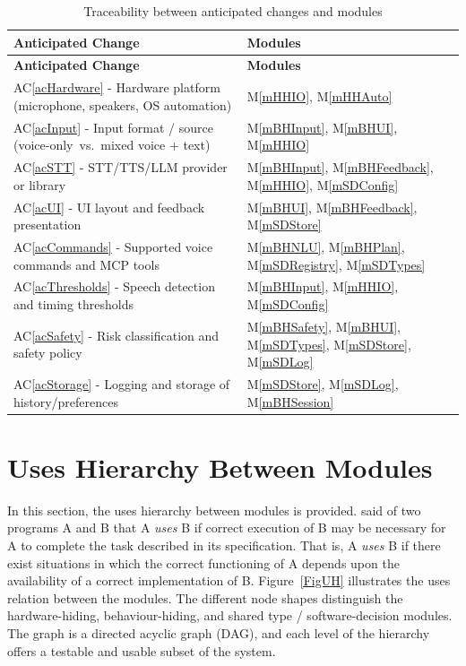 \documentclass[12pt, titlepage]{article}
\newcommand{\acref}[1]{AC\ref{#1}}
\newcommand{\mref}[1]{M\ref{#1}}
\begin{document}
\renewcommand{\arraystretch}{1.1}
\begin{longtable}{p{} p{}}
\caption{Traceability between anticipated changes and modules}
\label{TblACT}\\
\toprule
\textbf{Anticipated Change} & \textbf{Modules}\\
\midrule
\endfirsthead
\toprule
\textbf{Anticipated Change} & \textbf{Modules}\\
\midrule
\endhead
\acref{acHardware} - Hardware platform (microphone, speakers, OS automation)
  & \mref{mHHIO}, \mref{mHHAuto} \\
\acref{acInput} - Input format / source (voice-only~vs.~mixed voice + text)
  & \mref{mBHInput}, \mref{mBHUI}, \mref{mHHIO} \\
\acref{acSTT} - STT/TTS/LLM provider or library
  & \mref{mBHInput}, \mref{mBHFeedback}, \mref{mHHIO}, \mref{mSDConfig} \\
\acref{acUI} - UI layout and feedback presentation
  & \mref{mBHUI}, \mref{mBHFeedback}, \mref{mSDStore} \\
\acref{acCommands} - Supported voice commands and MCP tools
  & \mref{mBHNLU}, \mref{mBHPlan}, \mref{mSDRegistry}, \mref{mSDTypes} \\
\acref{acThresholds} - Speech detection and timing thresholds
  & \mref{mBHInput}, \mref{mHHIO}, \mref{mSDConfig} \\
\acref{acSafety} - Risk classification and safety policy
  & \mref{mBHSafety}, \mref{mBHUI}, \mref{mSDTypes}, \mref{mSDStore},
    \mref{mSDLog} \\
\acref{acStorage} - Logging and storage of history/preferences
  & \mref{mSDStore}, \mref{mSDLog}, \mref{mBHSession} \\
\bottomrule
\end{longtable}

\section{Uses Hierarchy Between Modules} \label{SecUse}

In this section, the uses hierarchy between modules is provided.
\citet{Parnas1978} said of two programs A and B that A {\em uses} B if correct
execution of B may be necessary for A to complete the task described in its
specification. That is, A {\em uses} B if there exist situations in which the
correct functioning of A depends upon the availability of a correct
implementation of B. Figure~\ref{FigUH} illustrates the uses relation between
the modules. The different node shapes distinguish the hardware-hiding,
behaviour-hiding, and shared type / software-decision modules. The graph is a
directed acyclic graph (DAG), and each level of the hierarchy offers a testable
and usable subset of the system.
\end{document}
